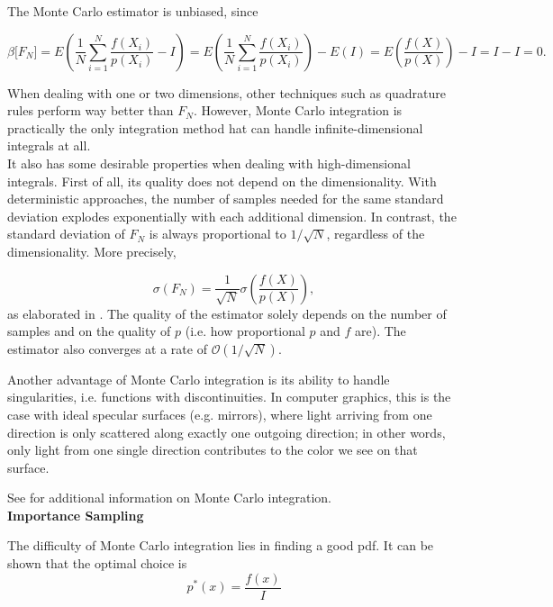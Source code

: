 The Monte Carlo estimator is unbiased, since

\begin{equation*}
\beta\lbrack F_N\rbrack = E\left( \frac{1}{N}\sum_{i = 1}^N \frac{f(X_i)}{p(X_i)} - I\right) = E\left( \frac{1}{N}\sum_{i = 1}^N \frac{f(X_i)}{p(X_i)}\right) - E(I) =  E\left(\frac{f(X)}{p(X)}\right) - I = I-I = 0.
\end{equation*}

When dealing with one or two dimensions, other techniques such as quadrature rules perform way better than $F_N$. However, Monte Carlo integration is practically the only integration method hat can handle infinite-dimensional integrals at all. \\
It also has some desirable properties when dealing with high-dimensional integrals. First of all, its quality does not depend on the dimensionality. With deterministic approaches, the number of samples needed for the same standard deviation explodes exponentially with each additional dimension. In contrast, the standard deviation of $F_N$ is always proportional to $1/\sqrt{N}$, regardless of the dimensionality. More precisely,

\begin{equation}
\label{deviation}
\sigma(F_N) = \frac{1}{\sqrt{N}}\sigma \left(\frac{f(X)}{p(X)}\right),
\end{equation}
as elaborated in \cite{veachdiss}. The quality of the estimator solely depends on the number of samples and on the quality of $p$ (i.e. how proportional $p$ and $f$ are). The estimator also converges at a rate of $\mathcal{O}(1/\sqrt{N})$.

Another advantage of Monte Carlo integration is its ability to handle singularities, i.e. functions with discontinuities. In computer graphics, this is the case with ideal specular surfaces (e.g. mirrors), where light arriving from one direction is only scattered along exactly one outgoing direction; in other words, only light from one single direction contributes to the color we see on that surface.

See \cite[chapter 2]{veachdiss} for additional information on Monte Carlo integration.\\


\textbf{Importance Sampling}

The difficulty of Monte Carlo integration lies in finding a good pdf. It can be shown that the optimal choice is 
\begin{equation*}
p^*(x) = \frac{f(x)}{I}
\end{equation*}

